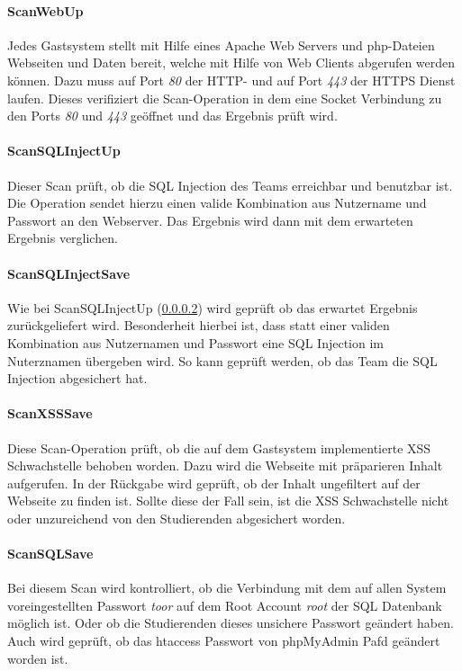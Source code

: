 \paragraph{ScanWebUp}\label{para:ScanWebUp}
Jedes Gastsystem stellt mit Hilfe eines Apache Web Servers und php-Dateien Webseiten und Daten bereit, welche mit Hilfe von Web Clients abgerufen werden können. Dazu muss auf Port \textit{80} der HTTP- und auf Port \textit{443} der HTTPS Dienst laufen. Dieses verifiziert die Scan-Operation in dem eine Socket Verbindung zu den Ports \textit{80} und \textit{443} geöffnet und das Ergebnis prüft wird.

\paragraph{ScanSQLInjectUp}\label{para:ScanSQLInjectUp}
Dieser Scan prüft, ob die SQL Injection des Teams erreichbar und benutzbar ist. Die Operation sendet hierzu einen valide Kombination aus Nutzername und Passwort an den Webserver. Das Ergebnis wird dann mit dem erwarteten Ergebnis verglichen.

\paragraph{ScanSQLInjectSave}\label{para:ScanSQLInjectSave}
Wie bei ScanSQLInjectUp (\ref{para:ScanSQLInjectUp}) wird geprüft ob das erwartet Ergebnis zurückgeliefert wird. Besonderheit hierbei ist, dass statt einer validen Kombination aus Nutzernamen und Passwort eine SQL Injection im Nuterznamen übergeben wird. So kann geprüft werden, ob das Team die SQL Injection abgesichert hat.

\paragraph{ScanXSSSave}\label{para:ScanXSSSave}
Diese Scan-Operation prüft, ob die auf dem Gastsystem implementierte XSS Schwachstelle behoben worden. Dazu wird die Webseite mit präparieren Inhalt aufgerufen. In der Rückgabe wird geprüft, ob der Inhalt ungefiltert auf der Webseite zu finden ist. Sollte diese der Fall sein, ist die XSS Schwachstelle nicht oder unzureichend von den Studierenden abgesichert worden.

\paragraph{ScanSQLSave}\label{para:ScanSQLSave}
Bei diesem Scan wird kontrolliert, ob die Verbindung mit dem auf allen System voreingestellten Passwort \textit{toor} auf dem Root Account \textit{root} der SQL Datenbank möglich ist. Oder ob die Studierenden dieses unsichere Passwort geändert haben. Auch wird geprüft, ob das htaccess Passwort von phpMyAdmin Pafd geändert worden ist.

